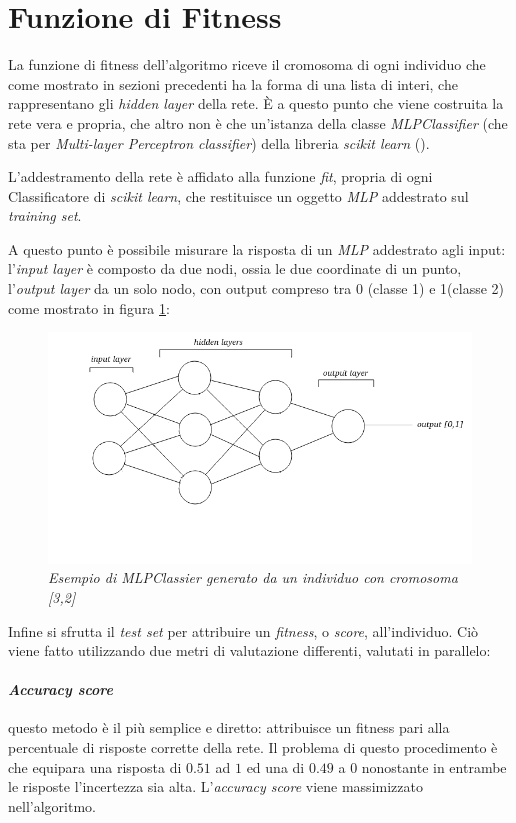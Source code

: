 \documentclass[12pt,a4paper]{report}
\begin{document}
\section{Funzione di Fitness}

La funzione di fitness dell'algoritmo riceve il cromosoma di ogni individuo che come mostrato in sezioni precedenti ha la forma di una lista di interi, che rappresentano gli \textit{hidden layer} della rete.
È a questo punto che viene costruita la rete vera e propria, che altro non è che un'istanza della classe \textit{MLPClassifier} (che sta per \textit{Multi-layer Perceptron classifier}) della libreria \textit{scikit learn} (\cite{scikit-learn}).

L'addestramento della rete è affidato alla funzione \textit{fit}, propria di ogni Classificatore di \textit{scikit learn}, che restituisce un oggetto \textit{MLP} addestrato sul \textit{training set}.

A questo punto è possibile misurare la risposta di un \textit{MLP} addestrato agli input: l'\textit{input layer} è composto da due nodi, ossia le due coordinate di un punto, l'\textit{output layer} da un solo nodo, con output compreso tra 0 (classe 1) e 1(classe 2) come mostrato in figura \ref{MLP}:

\begin{figure}[H]
 \centering
 \includegraphics[scale = 0.55]{images/MLPClass}
 \caption {\textit{Esempio di MLPClassier generato da un individuo con cromosoma [3,2]}}
 \label{MLP}
\end{figure}

Infine si sfrutta il \textit{test set} per attribuire un \textit{fitness}, o \textit{score}, all'individuo.
Ciò viene fatto utilizzando due metri di valutazione differenti, valutati in parallelo: 

\paragraph{\textit{Accuracy score}} questo metodo è il più semplice e diretto: attribuisce un fitness pari alla percentuale di risposte corrette della rete. Il problema di questo procedimento è che equipara una risposta di $0.51$ ad $1$ ed una di $0.49$ a $0$ nonostante in entrambe le risposte l'incertezza sia alta.
L'\textit{accuracy score} viene massimizzato nell'algoritmo.
\end{document}
